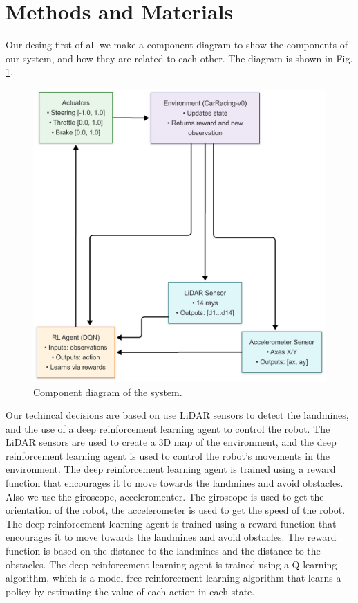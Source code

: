 \section{Methods and Materials}

Our desing first of all we make a component diagram to show the components of our system,
and how they are related to each other. The diagram is shown in Fig. \ref{fig:component_diagram}.
\begin{figure}[h]
    \centering
    \includegraphics[width=0.8\linewidth]{images/ComponentDiagram.png}
    \caption{Component diagram of the system.}
    \label{fig:component_diagram}
\end{figure}

Our techincal decisions are based on use LiDAR sensors to detect the landmines, and the use of a deep reinforcement learning agent to control the robot. The LiDAR sensors are used to create a 3D map of the environment, and the deep reinforcement learning agent is used to control the robot's movements in the environment. The deep reinforcement learning agent is trained using a reward function that encourages it to move towards the landmines and avoid obstacles. Also we use the giroscope, acceleromenter. The giroscope is used to get the orientation of the robot, the accelerometer is used to get the speed of the robot. The deep reinforcement learning agent is trained using a reward function that encourages it to move towards the landmines and avoid obstacles. The reward function is based on the distance to the landmines and the distance to the obstacles. The deep reinforcement learning agent is trained using a Q-learning algorithm, which is a model-free reinforcement learning algorithm that learns a policy by estimating the value of each action in each state.